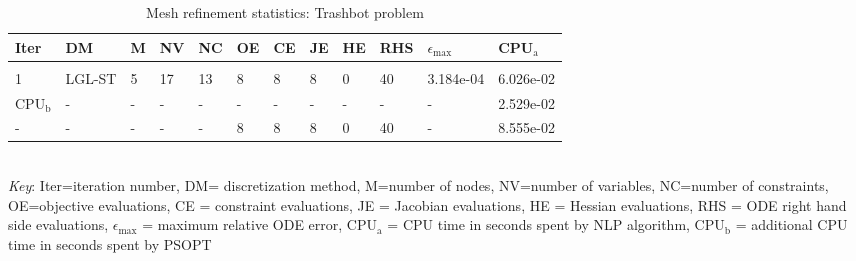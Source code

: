
\begin{table}
\caption{Mesh refinement statistics: Trashbot problem}
\label{mesh_stats_trashbot}
\renewcommand{\tabcolsep}{0.15cm}
\tiny
\begin{tabular}{llllllllllll}
Iter&DM&M&NV&NC&OE&CE&JE&HE&RHS&$\epsilon_{\max}$&CPU$_\mathrm{a}$ \\ \hline \\
1&LGL-ST&5&17&13&8&8&8&0&40&3.184e-04&6.026e-02\\
\hline
CPU$_\mathrm{b}$ &-&-&-&-&-&-&-&-&-&-&2.529e-02\\
-&-&-&-&-&8&8&8&0&40&-&8.555e-02\\
\end{tabular}
\newline \\ \emph{Key}: Iter=iteration number, DM= discretization method, M=number of nodes, NV=number of variables, NC=number of constraints, OE=objective evaluations,  	              CE = constraint evaluations, JE = Jacobian evaluations, HE = Hessian evaluations, RHS = ODE right hand side 		      evaluations, $\epsilon_{\max}$ = maximum relative ODE error, CPU$_\mathrm{a}$ = CPU time in seconds spent by NLP algorithm, 		      CPU$_\mathrm{b}$ = additional CPU time in seconds spent by PSOPT
\normalsize
\end{table}